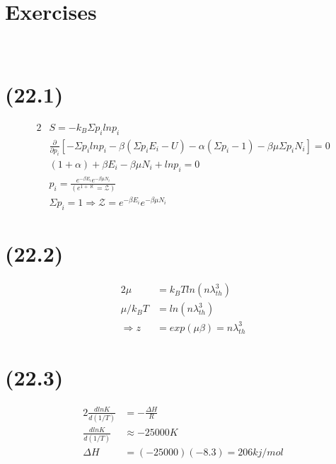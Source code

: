 \begin{latin}
    \section*{Exercises}‬
    \section*{(22.1)}
    \begin{alignat*}{2}
        &S = -k_B \Sigma p_i ln p_i \\
        &\frac{\partial }{\partial p_i}[- \Sigma p_i ln p_i - \beta ( \Sigma p_i E_i - U)- \alpha ( \Sigma p_i - 1)- \beta\mu \Sigma p_i N_i] = 0\\
        &(1+ \alpha) + \beta E_i - \beta\mu N_i + ln p_i = 0\\
        &p_i = \frac{e^{-\beta E_i}e^{-\beta \mu N_i}}{(e^{1+\aleph } =\mathcal{Z} )}\\
        &\Sigma p_i = 1 \Rightarrow \mathcal{Z} = e^{-\beta E_i}e^{-\beta \mu N_i}
    \end{alignat*}
    \section*{(22.2)}
    \begin{alignat*}{2}
        \mu &= k_B T ln (n\lambda_{th}^3)\\
        \mu / k_B T &= ln (n\lambda_{th}^3)\\
        \Longrightarrow z &= exp(\mu \beta) = n\lambda_{th}^3
    \end{alignat*}
    \section*{(22.3)}
    \begin{alignat*}{2}
        \frac{dlnK}{d(1/T)} &= -\frac{\Delta H}{R}\\
        \frac{dlnK}{d(1/T)} &\approx - 25000 K\\
        \Delta H &= (-25000)(-8.3) = 206 kj/mol
    \end{alignat*}

\end{latin}
